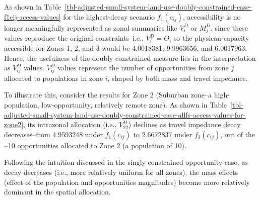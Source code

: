 \documentclass[
  10pt,
  letterpaper,
]{article}
\begin{document}
As shown in
Table~\ref{tbl-adjusted-small-system-land-use-doubly-constrained-case-f1cij-access-values}
for the highest-decay scenario \(f_1(c_{ij})\), accessibility is no
longer meaningfully represented as zonal summaries like \(V^D_i\) or
\(M^D_j\), since these values reproduce the original constraints--i.e.,
\(V^D_i = O_i\) so the physican-capacity accessible for Zones 1, 2, and
3 would be 4.0018381, 9.9963656, and 6.0017963. Hence, the usefulness of
the doubly constrained measure lies in the interpretation as
\(V_{ij}^D\) values. \(V^D_{ij}\) values represent the number of
opportunities from zone \(j\) allocated to populations in zone \(i\),
shaped by both mass and travel impedance.

To illustrate this, consider the results for Zone 2 (Suburban zone--a
high-population, low-opportunity, relatively remote zone). As shown in
Table~\ref{tbl-adjusted-small-system-land-use-doubly-constrained-case-allfs-access-values-for-zone2},
its intrazonal allocation (i.e., \(V^D_{22}\)) declines as travel
impedance decay decreases--from 4.9593248 under \(f_1(c_{ij})\) to
2.6672837 under \(f_3(c_{ij})\), out of the \textasciitilde10
opportunities allocated to Zone 2 (a population of 10).

Following the intuition discussed in the singly constrained opportunity
case, as decay decreases (i.e., more relatively uniform for all zones),
the mass effects (effect of the population and opportunities magnitudes)
become more relatively dominant in the spatial allocation.
\end{document}
